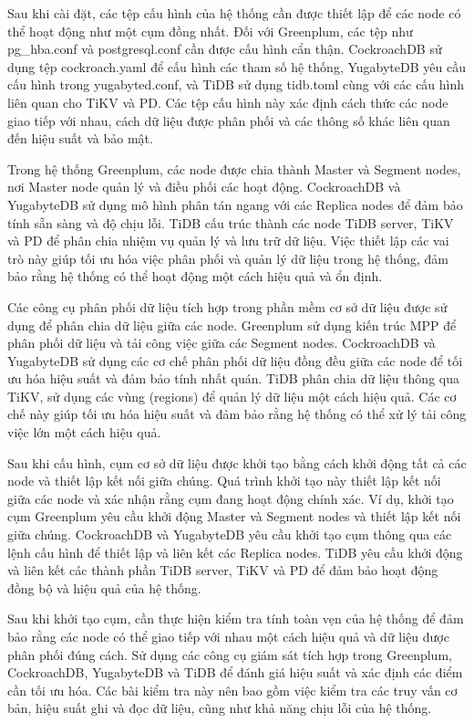 \documentclass[14pt]{article}
\begin{document}
Sau khi cài đặt, các tệp cấu hình của hệ thống cần được thiết lập để các node có thể hoạt động như một cụm đồng nhất. Đối với Greenplum, các tệp như pg\_hba.conf và postgresql.conf cần được cấu hình cẩn thận. CockroachDB sử dụng tệp cockroach.yaml để cấu hình các tham số hệ thống, YugabyteDB yêu cầu cấu hình trong yugabyted.conf, và TiDB sử dụng tidb.toml cùng với các cấu hình liên quan cho TiKV và PD. Các tệp cấu hình này xác định cách thức các node giao tiếp với nhau, cách dữ liệu được phân phối và các thông số khác liên quan đến hiệu suất và bảo mật.

Trong hệ thống Greenplum, các node được chia thành Master và Segment nodes, nơi Master node quản lý và điều phối các hoạt động. CockroachDB và YugabyteDB sử dụng mô hình phân tán ngang với các Replica nodes để đảm bảo tính sẵn sàng và độ chịu lỗi. TiDB cấu trúc thành các node TiDB server, TiKV và PD để phân chia nhiệm vụ quản lý và lưu trữ dữ liệu. Việc thiết lập các vai trò này giúp tối ưu hóa việc phân phối và quản lý dữ liệu trong hệ thống, đảm bảo rằng hệ thống có thể hoạt động một cách hiệu quả và ổn định.

Các công cụ phân phối dữ liệu tích hợp trong phần mềm cơ sở dữ liệu được sử dụng để phân chia dữ liệu giữa các node. Greenplum sử dụng kiến trúc MPP để phân phối dữ liệu và tải công việc giữa các Segment nodes. CockroachDB và YugabyteDB sử dụng các cơ chế phân phối dữ liệu đồng đều giữa các node để tối ưu hóa hiệu suất và đảm bảo tính nhất quán. TiDB phân chia dữ liệu thông qua TiKV, sử dụng các vùng (regions) để quản lý dữ liệu một cách hiệu quả. Các cơ chế này giúp tối ưu hóa hiệu suất và đảm bảo rằng hệ thống có thể xử lý tải công việc lớn một cách hiệu quả.

Sau khi cấu hình, cụm cơ sở dữ liệu được khởi tạo bằng cách khởi động tất cả các node và thiết lập kết nối giữa chúng. Quá trình khởi tạo này thiết lập kết nối giữa các node và xác nhận rằng cụm đang hoạt động chính xác. Ví dụ, khởi tạo cụm Greenplum yêu cầu khởi động Master và Segment nodes và thiết lập kết nối giữa chúng. CockroachDB và YugabyteDB yêu cầu khởi tạo cụm thông qua các lệnh cấu hình để thiết lập và liên kết các Replica nodes. TiDB yêu cầu khởi động và liên kết các thành phần TiDB server, TiKV và PD để đảm bảo hoạt động đồng bộ và hiệu quả của hệ thống.

Sau khi khởi tạo cụm, cần thực hiện kiểm tra tính toàn vẹn của hệ thống để đảm bảo rằng các node có thể giao tiếp với nhau một cách hiệu quả và dữ liệu được phân phối đúng cách. Sử dụng các công cụ giám sát tích hợp trong Greenplum, CockroachDB, YugabyteDB và TiDB để đánh giá hiệu suất và xác định các điểm cần tối ưu hóa. Các bài kiểm tra này nên bao gồm việc kiểm tra các truy vấn cơ bản, hiệu suất ghi và đọc dữ liệu, cũng như khả năng chịu lỗi của hệ thống.
\end{document}

